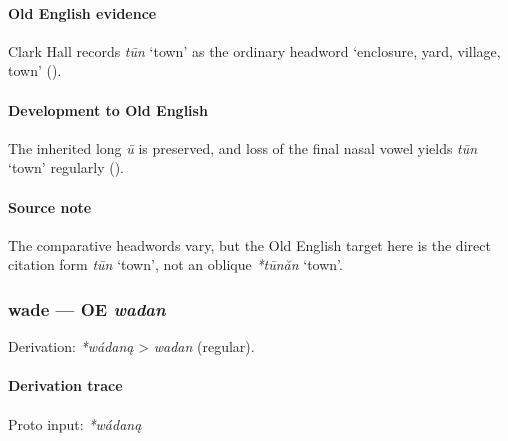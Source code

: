 \documentclass[
  british,
  a4paper,
]{article}
\providecommand{\Recon}[1]{\emph{*#1}}
\begin{document}
\paragraph{Old English evidence}\label{old-english-evidence-71}

Clark Hall records \emph{tūn} `town' as the ordinary headword
`enclosure, yard, village, town' ().

\paragraph{Development to Old
English}\label{development-to-old-english-70}

The inherited long \emph{ū} is preserved, and loss of the final nasal
vowel yields \emph{tūn} `town' regularly
().

\paragraph{Source note}\label{source-note-6}

The comparative headwords vary, but the Old English target here is the
direct citation form \emph{tūn} `town', not an oblique \Recon{tūnăn}
`town'.

\subsubsection{\texorpdfstring{wade --- OE
\emph{wadan}}{wade --- OE wadan}}\label{wade-oe-wadan}

Derivation: \emph{*wádaną} \textgreater{} \emph{wadan} (regular).

\paragraph{Derivation trace}\label{derivation-trace-89}

Proto input: \emph{*wádaną}

\begingroup
\setlength{\fboxsep}{6pt}
\end{document}
